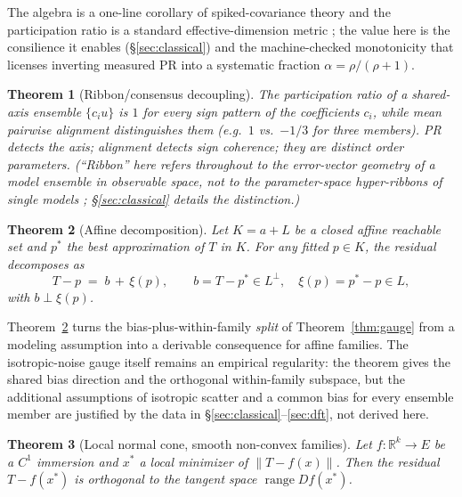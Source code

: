 \documentclass[11pt]{article}
\newtheorem{theorem}{Theorem}
\theoremstyle{remark}
\begin{document}
The algebra is a one-line corollary of spiked-covariance theory
\citep{johnstone2001} and the participation ratio is a standard
effective-dimension metric \citep{gao2015}; the value here is the consilience
it enables (\S\ref{sec:classical}) and the machine-checked monotonicity that
licenses inverting measured PR into a systematic fraction
$\alpha = \rho/(\rho+1)$.

\begin{theorem}[Ribbon/consensus decoupling]\label{thm:decouple}
The participation ratio of a shared-axis ensemble $\{c_i u\}$ is $1$ for every
sign pattern of the coefficients $c_i$, while mean pairwise alignment
distinguishes them (e.g.\ $1$ vs.\ $-1/3$ for three members). PR detects the
\emph{axis}; alignment detects \emph{sign coherence}; they are distinct order
parameters. (``Ribbon'' here refers throughout to the error-vector geometry of
a model \emph{ensemble} in observable space, not to the parameter-space
hyper-ribbons of single models \citep{transtrum2011,kurniawan2022};
\S\ref{sec:classical} details the distinction.)
\end{theorem}

\begin{theorem}[Affine decomposition]\label{thm:affine}
Let $K = a + L$ be a closed affine reachable set and $p^*$ the best
approximation of $T$ in $K$. For any fitted $p \in K$, the residual decomposes
as
\[
T - p \;=\; b \, +\, \xi(p),
\qquad b = T - p^* \in L^\perp, \quad \xi(p) = p^* - p \in L,
\]
with $b \perp \xi(p)$.
\end{theorem}

Theorem~\ref{thm:affine} turns the bias-plus-within-family \emph{split} of
Theorem~\ref{thm:gauge} from a modeling assumption into a derivable
consequence for affine families. The isotropic-noise gauge itself remains an
empirical regularity: the theorem gives the shared bias direction and the
orthogonal within-family subspace, but the additional assumptions of isotropic
scatter and a common bias for every ensemble member are justified by the data
in \S\ref{sec:classical}--\ref{sec:dft}, not derived here.

\begin{theorem}[Local normal cone, smooth non-convex families]\label{thm:smooth}
Let $f: \mathbb{R}^k \to E$ be a $C^1$ immersion and $x^*$ a local minimizer
of $\|T - f(x)\|$. Then the residual $T - f(x^*)$ is orthogonal to the tangent
space $\operatorname{range} Df(x^*)$.
\end{theorem}
\end{document}
